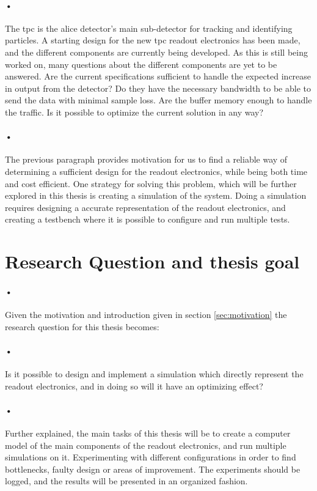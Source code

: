 \documentclass[a4paper, 12pt]{report}
\begin{document}
\paragraph{•}
The \gls{tpc} is the \gls{alice} detector's main sub-detector for tracking and identifying particles.
A starting design for the new \gls{tpc} readout electronics has been made, and the different components are currently being developed.
As this is still being worked on, many questions about the different components are yet to be answered.
Are the current specifications sufficient to handle the expected increase in output from the detector?
Do they have the necessary bandwidth to be able to send the data with minimal sample loss.
Are the buffer memory enough to handle the traffic.
Is it possible to optimize the current solution in any way?

\paragraph{•}
The previous paragraph provides motivation for us to find a reliable way of determining a sufficient design for the readout electronics, while being both time and cost efficient.
One strategy for solving this problem, which will be further explored in this thesis is creating a simulation of the system.
Doing a simulation requires designing a accurate representation of the readout electronics, and creating a testbench where it is possible to configure and run multiple tests.


\section{Research Question and thesis goal}

\paragraph{•}
Given the motivation and introduction given in section \ref{sec:motivation} the research question for this thesis becomes:

\paragraph{•}
Is it possible to design and implement a simulation which directly represent the readout electronics, and in doing so will it have an optimizing effect?

\paragraph{•}
Further explained, the main tasks of this thesis will be to create a computer model of the main components of the readout electronics, and run multiple simulations on it.
Experimenting with different configurations in order to find bottlenecks, faulty design or areas of improvement.
The experiments should be logged, and the results will be presented in an organized fashion.
\end{document}
